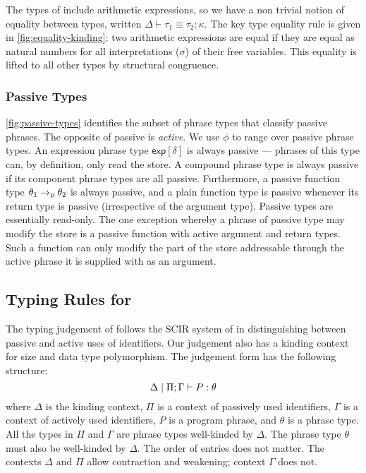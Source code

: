 The types of \DPIA include arithmetic expressions, so we have a non trivial notion of equality between types, written $\Delta \vdash \tau_1 \equiv \tau_2 : \kappa$. The key type equality rule is given in \autoref{fig:equality-kinding}: two arithmetic expressions are equal if they are equal as natural numbers for all interpretations ($\sigma$) of their free variables. This equality is lifted to all other types by structural congruence.

\subsubsection{Passive Types}
\label{sec:passive-types}

\autoref{fig:passive-types} identifies the subset of phrase types that classify passive phrases. The opposite of passive is \emph{active}. We use $\phi$ to range over passive phrase types. An expression phrase type $\mathsf{exp}[\delta]$ is always passive --- phrases of this type can, by definition, only read the store. A compound phrase type is always passive if its component phrase types are all passive. Furthermore, a passive function type $\theta_1 \to_{\textrm{p}} \theta_2$ is always passive, and a plain function type is passive whenever its return type is passive (irrespective of the argument type).
%
Passive types are essentially read-only. The one exception whereby a phrase of passive type may modify the store is a passive function with active argument and return types. Such a function can only modify the part of the store addressable through the active phrase it is supplied with as an argument.

\subsection{Typing Rules for \DPIA}
\label{sec:typing-rules}

The typing judgement of \DPIA follows the SCIR system of \citet{OHearnPTT99} in distinguishing between passive and active uses of identifiers. Our judgement also has a kinding context for size and data type polymorphism. The judgement form has the following structure:
\begin{displaymath}
  \Delta \mid \Pi; \Gamma \vdash P : \theta
\end{displaymath}
where $\Delta$ is the kinding context, $\Pi$ is a context of passively used identifiers, $\Gamma$ is a context of actively used identifiers, $P$ is a program phrase, and $\theta$ is a phrase type. All the types in $\Pi$ and $\Gamma$ are phrase types well-kinded by $\Delta$. The phrase type $\theta$ must also be well-kinded by $\Delta$. The order of entries does not matter. The contexts $\Delta$ and $\Pi$ allow contraction and weakening; context $\Gamma$ does not.


